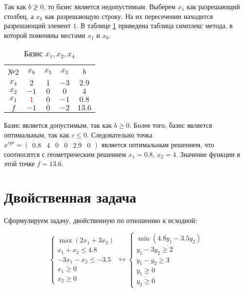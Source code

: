 Так как $b \ngeqslant 0$, то базис является недопустимым. Выберем $x_1$ как разрешающий столбец, а $x_6$ как разрешающую строку. На их пересечении находится разрешающий элемент $1$. В таблице \ref{tab:add_simplex_2} приведена таблица симплекс метода, в которой поменяны местами $x_1$ и $x_6$.

\begin{table}[H]
\begin{center}
	\def\tabcolsep{16pt}
	\def\arraystretch{1.3}
	\caption{Базис $x_1, x_2, x_4$}
	\label{tab:add_simplex_2}
	\begin{tabular}{|c||c|c|c||c|}
		\hline
		№2 & $x_6$ & $x_5$ & $x_3$ & $b$ \\ 
		\hhline{|=#===#=|}
		$x_4$ & $2$ & $1$ & $-3$ & $2.9$ \\ 
		\hline
		$x_2$ & $-1$ & $0$ & $0$ & $4$\\  
		\hline
		$x_1$ & \textcolor{red}{\boldmath$1$} & $0$ & $-1$ & $0.8$\\ 
		\hhline{|=#===#=|}
		$f$ & $-1$ & $0$ & $-2$ & $13.6$ \\ 
		\hline
	\end{tabular}
\end{center}
\end{table}

Базис является допустимым, так как $b \ge 0$. Более того, базис является оптимальным, так как $c \leq 0$. Следовательно точка $x^{opt} = \begin{pmatrix} 0.8 & 4 & 0 & 0 & 2.9 & 0 \end{pmatrix}$ является оптимальным решением, что соотносится с геометрическим решением $x_1 = 0.8$, $x_2 = 4$. Значение функции в этой точке $f = 13.6$.

\section{Двойственная задача}

Сформулируем задачу, двойственную по отношению к исходной:

\begin{equation*}
\begin{cases}
	\max \left( 2 x_1 + 3 x_2 \right) \\
	x_1 + x_2 \le 4.8 \\
	-3 x_1 - x_2 \le -3.5 \\
	x_1 \ge 0 \\
	x_2 \ge 0
\end{cases}
\longleftrightarrow
\begin{cases}
	\min \left( 4.8 y_1 - 3.5 y_2 \right) \\
	y_1 - 3y_2 \ge 2 \\
	y_1 - y_2 \ge 3 \\
	y_1 \ge 0 \\
	y_2 \ge 0
\end{cases}
\end{equation*}

